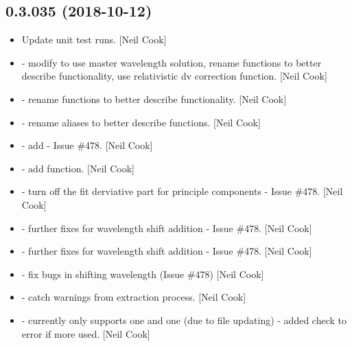 \documentclass[a4paper,10pt,english]{report}
\begin{document}
\subsection{0.3.035 (2018-10-12)}
\label{\detokenize{misc/changelog:id296}}\begin{itemize}
\item {} 
Update unit test runs. {[}Neil Cook{]}

\item {} 
 - modify  to use master
wavelength solution, rename functions to better describe
functionality, use relativistic dv correction function. {[}Neil Cook{]}

\item {} 
 - rename functions to better describe functionality.
{[}Neil Cook{]}

\item {} 
 - rename aliases to better describe functions.
{[}Neil Cook{]}

\item {} 
 - add  - Issue \#478. {[}Neil
Cook{]}

\item {} 
 - add  function. {[}Neil Cook{]}

\item {} 
 - turn off the fit derviative part for
principle components - Issue \#478. {[}Neil Cook{]}

\item {} 
 - further fixes for wavelength shift addition -
Issue \#478. {[}Neil Cook{]}

\item {} 
 - further fixes for wavelength shift addition - Issue
\#478. {[}Neil Cook{]}

\item {} 
 - fix bugs in shifting wavelength (Issue \#478) {[}Neil
Cook{]}

\item {} 
 - catch warnings from extraction process.
{[}Neil Cook{]}

\item {} 
 - currently only supports one  and one
 (due to file updating) - added check to error if more used.
{[}Neil Cook{]}


\end{itemize}
\end{document}
